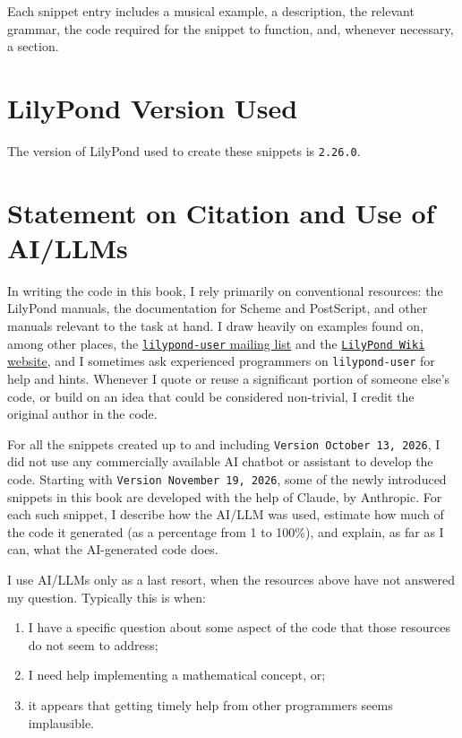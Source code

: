 Each snippet entry includes a musical example, a description, the relevant grammar, the code required for the snippet to function, and, whenever necessary, a  section.

\section{LilyPond Version Used}
The version of LilyPond used to create these snippets is \verb|2.26.0|.
\section{Statement on Citation and Use of AI/LLMs}
In writing the code in this book, I rely primarily on conventional resources: the LilyPond manuals, the documentation for Scheme and PostScript, and other manuals relevant to the task at hand. I draw heavily on examples found on, among other places, the \href{https://lists.gnu.org/archive/html/lilypond-user/}{\Verb|lilypond-user| mailing list} and the \href{https://wiki.lilypond.community/wiki/Main_Page}{\Verb|LilyPond Wiki| website}, and I sometimes ask experienced programmers on \verb|lilypond-user| for help and hints. Whenever I quote or reuse a significant portion of someone else's code, or build on an idea that could be considered non-trivial, I credit the original author in the code.

For all the snippets created up to and including \verb|Version October 13, 2026|, I did not use any commercially available AI chatbot or assistant to develop the code. Starting with \verb|Version November 19, 2026|, some of the newly introduced snippets in this book are developed with the help of Claude, by Anthropic. For each such snippet, I describe how the AI/LLM was used, estimate how much of the code it generated (as a percentage from 1 to 100\%), and explain, as far as I can, what the AI-generated code does.  

I use AI/LLMs only as a last resort, when the resources above have not answered my question. Typically this is when:
\begin{enumerate}
\itemsep-0.3cm
\item I have a specific question about some aspect of the code that those resources do not seem to address;
\item I need help implementing a mathematical concept, or;
\item it appears that getting timely help from other programmers seems implausible.
\end{enumerate}

